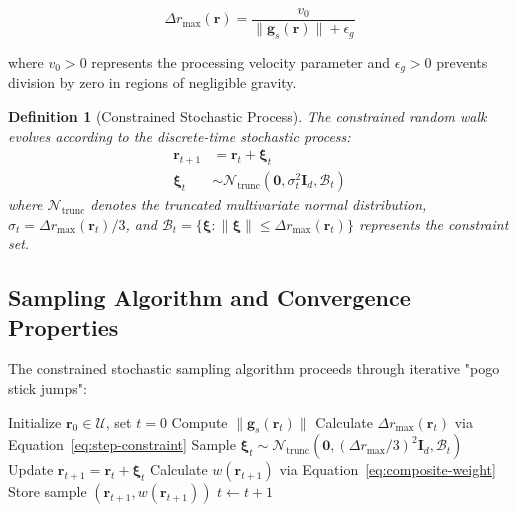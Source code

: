 \documentclass[11pt,a4paper]{article}
\newtheorem{definition}[theorem]{Definition}
\begin{document}
\begin{equation}
\Delta r_{\max}(\mathbf{r}) = \frac{v_0}{\|\mathbf{g}_s(\mathbf{r})\| + \epsilon_g}
\label{eq:step-constraint}
\end{equation}

where $v_0 > 0$ represents the processing velocity parameter and $\epsilon_g > 0$ prevents division by zero in regions of negligible gravity.

\begin{definition}[Constrained Stochastic Process]
The constrained random walk evolves according to the discrete-time stochastic process:
\begin{align}
\mathbf{r}_{t+1} &= \mathbf{r}_t + \boldsymbol{\xi}_t \label{eq:stochastic-evolution}\\
\boldsymbol{\xi}_t &\sim \mathcal{N}_{\text{trunc}}\left(\mathbf{0}, \sigma_t^2 \mathbf{I}_d, \mathcal{B}_t\right) \label{eq:truncated-normal}
\end{align}
where $\mathcal{N}_{\text{trunc}}$ denotes the truncated multivariate normal distribution, $\sigma_t = \Delta r_{\max}(\mathbf{r}_t)/3$, and $\mathcal{B}_t = \{\boldsymbol{\xi}: \|\boldsymbol{\xi}\| \leq \Delta r_{\max}(\mathbf{r}_t)\}$ represents the constraint set.
\end{definition}

\subsection{Sampling Algorithm and Convergence Properties}

The constrained stochastic sampling algorithm proceeds through iterative "pogo stick jumps":

\begin{algorithm}[H]
\caption{Constrained Stochastic Sampling}
\begin{algorithmic}[1]
\STATE Initialize $\mathbf{r}_0 \in \mathcal{U}$, set $t = 0$
    \STATE Compute $\|\mathbf{g}_s(\mathbf{r}_t)\|$
    \STATE Calculate $\Delta r_{\max}(\mathbf{r}_t)$ via Equation~\eqref{eq:step-constraint}
    \STATE Sample $\boldsymbol{\xi}_t \sim \mathcal{N}_{\text{trunc}}(\mathbf{0}, (\Delta r_{\max}/3)^2 \mathbf{I}_d, \mathcal{B}_t)$
    \STATE Update $\mathbf{r}_{t+1} = \mathbf{r}_t + \boldsymbol{\xi}_t$
    \STATE Calculate $w(\mathbf{r}_{t+1})$ via Equation~\eqref{eq:composite-weight}
    \STATE Store sample $(\mathbf{r}_{t+1}, w(\mathbf{r}_{t+1}))$
    \STATE $t \leftarrow t + 1$
\ENDWHILE
\end{algorithmic}
\end{algorithm}
\end{document}
